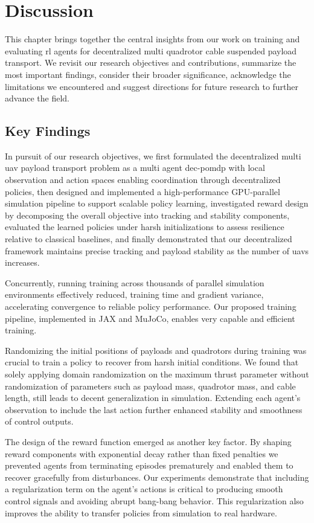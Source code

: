 \chapter{Discussion}
This chapter brings together the central insights from our work on training and evaluating \gls{rl} agents for decentralized multi quadrotor cable suspended payload transport. We revisit our research objectives and contributions, summarize the most important findings, consider their broader significance, acknowledge the limitations we encountered and suggest directions for future research to further advance the field.

\section{Key Findings}
In pursuit of our research objectives, we first formulated the decentralized multi \gls{uav} payload transport problem as a multi agent \gls{dec-pomdp} with local observation and action spaces enabling coordination through decentralized policies, then designed and implemented a high-performance GPU-parallel simulation pipeline to support scalable policy learning, investigated reward design by decomposing the overall objective into tracking and stability components, evaluated the learned policies under harsh initializations to assess resilience relative to classical baselines, and finally demonstrated that our decentralized framework maintains precise tracking and payload stability as the number of \glspl{uav} increases.

Concurrently, running training across thousands of parallel simulation environments effectively reduced, training time and gradient variance, accelerating convergence to reliable policy performance. Our proposed training pipeline, implemented in JAX and MuJoCo, enables very capable and efficient training.

Randomizing the initial positions of payloads and quadrotors during training was crucial to train a policy to recover from harsh initial conditions. We found that solely applying domain randomization on the maximum thrust parameter without randomization of parameters such as payload mass, quadrotor mass, and cable length, still leads to decent generalization in simulation. Extending each agent's observation to include the last action further enhanced stability and smoothness of control outputs.

The design of the reward function emerged as another key factor. By shaping reward components with exponential decay rather than fixed penalties we prevented agents from terminating episodes prematurely and enabled them to recover gracefully from disturbances. Our experiments demonstrate that including a regularization term on the agent's actions is critical to producing smooth control signals and avoiding abrupt bang-bang behavior. This regularization also improves the ability to transfer policies from simulation to real hardware. 

